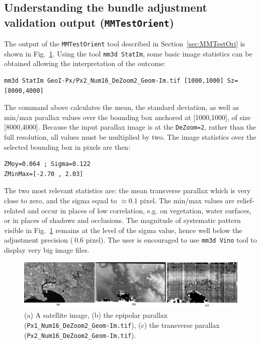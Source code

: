 \subsection{Understanding the bundle adjustment validation output ({\tt MMTestOrient})}
% 
The output of the {\tt MMTestOrient} tool described in Section~\ref{sec:MMTestOri} is shown in Fig.~\ref{fig:satMMTestOri}. Using the tool {\tt mm3d StatIm}, some basic image statistics can be obtained allowing the interpretation of the outcome:
\begin{verbatim}
mm3d StatIm GeoI-Px/Px2_Num16_DeZoom2_Geom-Im.tif [1000,1000] Sz=[8000,4000]
\end{verbatim}
%
The command above calculates the mean, the standard deviation, as well as min/max parallax values over the bounding box anchored at [1000,1000], of size [8000,4000]. Because the input parallax image is at the \texttt{DeZoom=2}, rather than the full resolution, all values must be multiplied by two. The image statistics over the selected bounding box in pixels are then:
\begin{verbatim}
ZMoy=0.064 ; Sigma=0.122
ZMinMax=[-2.70 , 2.03]
\end{verbatim}
%   
The two most relevant statistics are: the mean transverse parallax which is very close to zero, and the sigma equal to $\approx 0.1$ pixel. The min/max values are relief-related and occur in places of low correlation, e.g. on vegetation, water surfaces, or in places of shadows and occlusions. The magnitude of systematic pattern visible in Fig.~\ref{fig:satMMTestOri} remains at the level of the sigma value, hence well below the adjustment precision ($~0.6$ pixel). The user is encouraged to use \texttt{mm3d Vino} tool to display very big image files.
%
\begin{figure}[h!]
\centering
\includegraphics[width=0.95\linewidth]{FIGS/Satellites/IMG_Px1_Px2_Num16.png}
\caption{(a) A satellite image, (b) the epipolar parallax (\texttt{Px1\_Num16\_DeZoom2\_Geom-Im.tif}), (c) the transverse parallax (\texttt{Px2\_Num16\_DeZoom2\_Geom-Im.tif}).}
\label{fig:satMMTestOri}
\end{figure}


